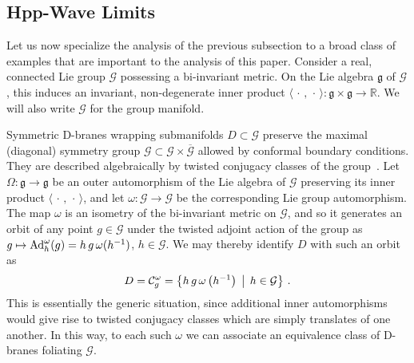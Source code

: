\documentclass[11pt,a4paper]{article}
\newcommand{\real}{{\mathbb R}} %
\newcommand{\beq}{\begin{eqnarray}}
\newcommand{\eeq}{\end{eqnarray}}
\begin{document}
\subsection{Hpp-Wave Limits\label{PGLNW}}

Let us now specialize the analysis of the previous subsection to a broad
class of examples that are important to the analysis of this
paper. Consider a real, connected Lie group $\mathcal{G}$ possessing a
bi-invariant metric. On the Lie algebra $\mathfrak g$ of
$\mathcal{G}$, this induces an invariant, non-degenerate inner product
$\langle\,\cdot\,,\,\cdot\,\rangle:\mathfrak{g}\times\mathfrak{g}\to\real$.
We will also write $\mathcal{G}$ for the group manifold.

Symmetric D-branes wrapping submanifolds $D\subset \mathcal{G}$
preserve the maximal (diagonal) symmetry group
$\mathcal{G}\subset\mathcal{G}\times\overline{\mathcal G}$ allowed by
conformal boundary conditions. They are described algebraically by
twisted conjugacy classes of the group~\cite{AS1,FFFS1,FS1,Stanciu2}. Let
$\Omega:\mathfrak{g}\to\mathfrak{g}$ be an outer automorphism of the
Lie algebra of $\mathcal{G}$ preserving its inner product
$\langle\,\cdot\,,\,\cdot\,\rangle$, and let $\omega:\mathcal{G}\to
\mathcal{G}$ be the corresponding Lie group automorphism. The map
$\omega$ is an isometry of the bi-invariant metric on $\mathcal G$, and so it
generates an orbit of any point $g\in \mathcal{G}$ under the
twisted adjoint action of the group as $g\mapsto{\rm
  Ad}_h^\omega(g)=h\,g\,\omega(h^{-1})$, $h\in \mathcal{G}$. We may
thereby identify $D$ with such an orbit as
\beq
D={\mathcal C}_g^\omega=\bigl\{h\,g\,\omega\left(h^{-1}\right)\,
\bigm|\,h\in \mathcal{G}\bigr\} \ .
\label{Dtwistconj}\eeq
This is essentially the generic situation, since additional inner
automorphisms would give rise to twisted conjugacy classes which are
simply translates of one another. In this way, to each such $\omega$
we can associate an equivalence class of D-branes foliating
$\mathcal{G}$.
\end{document}
